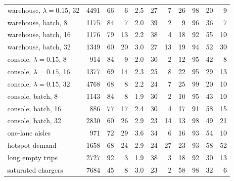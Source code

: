 \begin{table}[t]
\begin{tabular}{lrrrrrrrrrr}
warehouse, $\lambda{=}0.15$, 32 & 4491 & 66 & 6 & 2.5 & 27 & 7 & 26 & 98 & 20 & 9\\
warehouse, batch, 8 & 1175 & 84 & 7 & 2.0 & 39 & 2 & 9 & 96 & 36 & 7\\
warehouse, batch, 16 & 1176 & 79 & 13 & 2.2 & 38 & 4 & 18 & 92 & 55 & 10\\
warehouse, batch, 32 & 1349 & 60 & 20 & 3.0 & 27 & 13 & 19 & 94 & 52 & 30\\
console, $\lambda{=}0.15$, 8 & 914 & 84 & 9 & 2.0 & 30 & 2 & 12 & 95 & 42 & 8\\
console, $\lambda{=}0.15$, 16 & 1377 & 69 & 14 & 2.3 & 25 & 8 & 22 & 95 & 29 & 13\\
console, $\lambda{=}0.15$, 32 & 4768 & 68 & 8 & 2.2 & 24 & 7 & 25 & 99 & 20 & 10\\
console, batch, 8 & 1143 & 84 & 8 & 1.9 & 30 & 2 & 10 & 95 & 43 & 10\\
console, batch, 16 & 886 & 77 & 17 & 2.4 & 30 & 4 & 17 & 91 & 58 & 15\\
console, batch, 32 & 2830 & 60 & 26 & 2.9 & 23 & 14 & 13 & 98 & 49 & 21\\
\midrule
one-lane aisles & 971 & 72 & 29 & 3.6 & 34 & 6 & 16 & 93 & 54 & 10\\
hotspot demand & 1658 & 68 & 24 & 2.9 & 24 & 27 & 23 & 93 & 58 & 52\\
long empty trips & 2727 & 92 & 3 & 1.9 & 38 & 3 & 18 & 92 & 30 & 13\\
saturated chargers & 7684 & 45 & 8 & 3.0 & 23 & 2 & 58 & 98 & 32 & 6\\
\bottomrule
\end{tabular}
\end{table}

